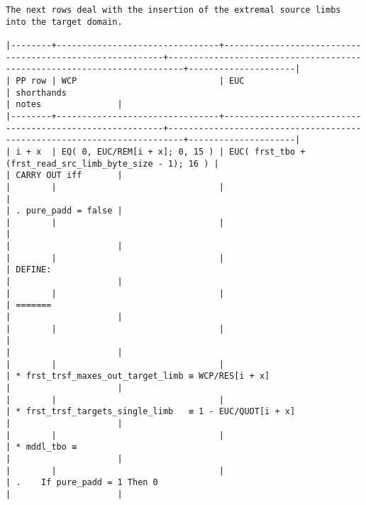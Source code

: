 \documentclass[varwidth=\maxdimen,margin=0.5cm,multi={verbatim}]{standalone}
\begin{document}
\begin{verbatim}
The next rows deal with the insertion of the extremal source limbs into the target domain.

|--------+--------------------------------+----------------------------------------------------------+-------------------------------------------------------------------------+---------------------|
| PP row | WCP                            | EUC                                                      | shorthands                                                              | notes               |
|--------+--------------------------------+----------------------------------------------------------+-------------------------------------------------------------------------+---------------------|
| i + x  | EQ( 0, EUC/REM[i + x]; 0, 15 ) | EUC( frst_tbo + (frst_read_src_limb_byte_size - 1); 16 ) |                                                                         | CARRY OUT iff       |
|        |                                |                                                          |                                                                         | . pure_padd = false |
|        |                                |                                                          |                                                                         |                     |
|        |                                |                                                          | DEFINE:                                                                 |                     |
|        |                                |                                                          | =======                                                                 |                     |
|        |                                |                                                          |                                                                         |                     |
|        |                                |                                                          | * frst_trsf_maxes_out_target_limb ≡ WCP/RES[i + x]                      |                     |
|        |                                |                                                          | * frst_trsf_targets_single_limb   ≡ 1 - EUC/QUOT[i + x]                 |                     |
|        |                                |                                                          | * mddl_tbo ≡                                                            |                     |
|        |                                |                                                          | .    If pure_padd = 1 Then 0                                            |                     |

\end{verbatim}
\end{document}
